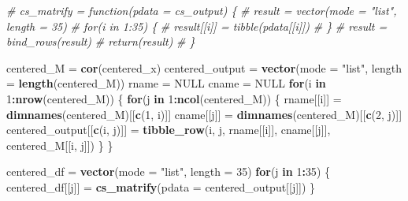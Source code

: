 \documentclass[
]{article}
\newenvironment{Shaded}{\begin{snugshade}}{\end{snugshade}}
\newcommand{\CommentTok}[1]{\textcolor[rgb]{0.56,0.35,0.01}{\textit{#1}}}
\newcommand{\ControlFlowTok}[1]{\textcolor[rgb]{0.13,0.29,0.53}{\textbf{#1}}}
\newcommand{\DataTypeTok}[1]{\textcolor[rgb]{0.13,0.29,0.53}{#1}}
\newcommand{\DecValTok}[1]{\textcolor[rgb]{0.00,0.00,0.81}{#1}}
\newcommand{\KeywordTok}[1]{\textcolor[rgb]{0.13,0.29,0.53}{\textbf{#1}}}
\newcommand{\NormalTok}[1]{#1}
\newcommand{\OperatorTok}[1]{\textcolor[rgb]{0.81,0.36,0.00}{\textbf{#1}}}
\newcommand{\OtherTok}[1]{\textcolor[rgb]{0.56,0.35,0.01}{#1}}
\newcommand{\StringTok}[1]{\textcolor[rgb]{0.31,0.60,0.02}{#1}}
\begin{document}
\begin{Shaded}
\begin{Highlighting}[]
\CommentTok{# cs_matrify = function(pdata = cs_output) \{}
\CommentTok{#   result = vector(mode = "list", length = 35)}
\CommentTok{#   for(i in 1:35) \{}
\CommentTok{#       result[[i]] = tibble(pdata[[i]])}
\CommentTok{#   \}}
\CommentTok{#   result = bind_rows(result)}
\CommentTok{#   return(result)}
\CommentTok{# \}}
\end{Highlighting}
\end{Shaded}

\begin{Shaded}
\begin{Highlighting}[]
\NormalTok{centered_M =}\StringTok{ }\KeywordTok{cor}\NormalTok{(centered_x)}
\NormalTok{centered_output =}\StringTok{ }\KeywordTok{vector}\NormalTok{(}\DataTypeTok{mode =} \StringTok{"list"}\NormalTok{, }\DataTypeTok{length =} \KeywordTok{length}\NormalTok{(centered_M))}
\NormalTok{rname =}\StringTok{ }\OtherTok{NULL}
\NormalTok{cname =}\StringTok{ }\OtherTok{NULL}
\ControlFlowTok{for}\NormalTok{(i }\ControlFlowTok{in} \DecValTok{1}\OperatorTok{:}\KeywordTok{nrow}\NormalTok{(centered_M)) \{}
  \ControlFlowTok{for}\NormalTok{(j }\ControlFlowTok{in} \DecValTok{1}\OperatorTok{:}\KeywordTok{ncol}\NormalTok{(centered_M)) \{}
\NormalTok{    rname[[i]] =}\StringTok{ }\KeywordTok{dimnames}\NormalTok{(centered_M)[[}\KeywordTok{c}\NormalTok{(}\DecValTok{1}\NormalTok{, i)]]}
\NormalTok{    cname[[j]] =}\StringTok{ }\KeywordTok{dimnames}\NormalTok{(centered_M)[[}\KeywordTok{c}\NormalTok{(}\DecValTok{2}\NormalTok{, j)]]}
\NormalTok{    centered_output[[}\KeywordTok{c}\NormalTok{(i, j)]] =}\StringTok{ }\KeywordTok{tibble_row}\NormalTok{(i, j, rname[[i]], cname[[j]], centered_M[[i, j]])}
\NormalTok{  \}}
\NormalTok{\}}
\end{Highlighting}
\end{Shaded}

\begin{Shaded}
\begin{Highlighting}[]
\NormalTok{centered_df =}\StringTok{ }\KeywordTok{vector}\NormalTok{(}\DataTypeTok{mode =} \StringTok{"list"}\NormalTok{, }\DataTypeTok{length =} \DecValTok{35}\NormalTok{)}
\ControlFlowTok{for}\NormalTok{(j }\ControlFlowTok{in} \DecValTok{1}\OperatorTok{:}\DecValTok{35}\NormalTok{) \{}
\NormalTok{  centered_df[[j]] =}\StringTok{ }\KeywordTok{cs_matrify}\NormalTok{(}\DataTypeTok{pdata =}\NormalTok{ centered_output[[j]])}
\NormalTok{\}}
\end{Highlighting}
\end{Shaded}
\end{document}

